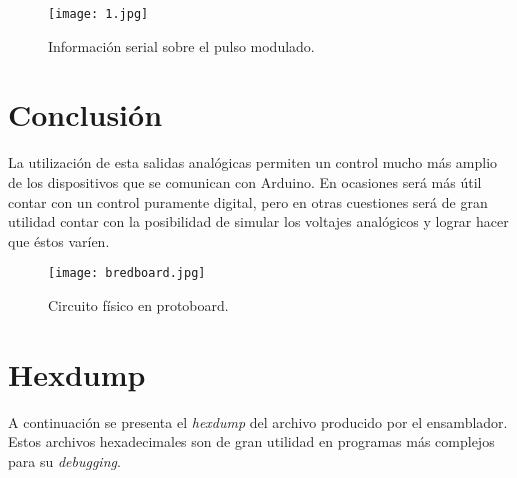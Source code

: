 \documentclass[12pt, letterpaper]{article}
\begin{document}
\begin{figure}[H]
	\centering
	\texttt{[image: 1.jpg]}
	\caption{Información serial sobre el pulso modulado.}
\end{figure}

\section*{Conclusión}
La utilización de esta salidas analógicas permiten un control mucho más amplio de los dispositivos que se comunican con Arduino. En ocasiones será más útil contar con un control puramente digital, pero en otras cuestiones será de gran utilidad contar con la posibilidad de simular los voltajes analógicos y lograr hacer que éstos varíen. 

\begin{figure}[H]
	\centering
	\texttt{[image: bredboard.jpg]}
	\caption{Circuito físico en protoboard.}
\end{figure}

\section*{Hexdump}
A continuación se presenta el \textit{hexdump} del archivo producido por el ensamblador. Estos archivos hexadecimales son de gran utilidad en programas más complejos para su \textit{debugging}.

\scriptsize


\renewcommand\refname{References}
\printbibliography
\end{document}

